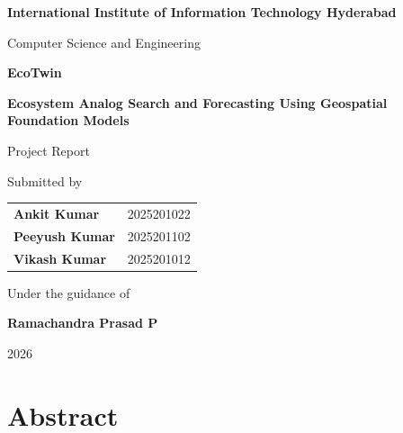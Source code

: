\documentclass[12pt,a4paper,oneside]{report}
\newcommand{\projecttitle}{EcoTwin}
\newcommand{\projectsubtitle}{
Ecosystem Analog Search and Forecasting Using Geospatial Foundation Models
}
\newcommand{\supervisorname}{Ramachandra Prasad P}
\newcommand{\departmentname}{Computer Science and Engineering}
\newcommand{\institutionname}{International Institute of Information Technology Hyderabad}
\newcommand{\reportyear}{2026}
\begin{document}

\begin{titlepage}
\begin{center}
\vspace*{1cm}

{\Large \textbf{\institutionname}}

\vspace{0.5cm}
{\large \departmentname}

\vspace{2cm}

{\Huge \textbf{\projecttitle}}

\vspace{0.7cm}

{\Large \textbf{\projectsubtitle}}

\vspace{2cm}

{\large Project Report}

\vspace{1.5cm}

Submitted by

\vspace{0.4cm}
{\large
\begin{tabular}{ll}
\textbf{Ankit Kumar}   & 2025201022 \\[4pt]
\textbf{Peeyush Kumar} & 2025201102 \\[4pt]
\textbf{Vikash Kumar}  & 2025201012 \\
\end{tabular}
}

\vspace{1.5cm}

Under the guidance of

\vspace{0.4cm}
{\Large \textbf{\supervisorname}}

\vfill
{\large \reportyear}

\end{center}
\end{titlepage}


\chapter*{Abstract}
\end{document}
